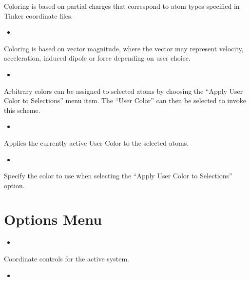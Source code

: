\documentclass[letterpaper,11pt,english]{sphinxmanual}
\begin{document}
\sphinxAtStartPar
Coloring is based on partial charges that correspond to atom types specified in Tinker coordinate files.
\begin{itemize}
\item {} 
\sphinxAtStartPar
{}

\end{itemize}

\sphinxAtStartPar
Coloring is based on vector magnitude, where the vector may represent velocity, acceleration, induced dipole or force depending on user choice.
\begin{itemize}
\item {} 
\sphinxAtStartPar
{}

\end{itemize}

\sphinxAtStartPar
Arbitrary colors can be assigned to selected atoms by choosing the “Apply User Color to Selections” menu item. The “User Color” can then be selected to invoke this scheme.
\begin{itemize}
\item {} 
\sphinxAtStartPar
{}

\end{itemize}

\sphinxAtStartPar
Applies the currently active User Color to the selected atoms.
\begin{itemize}
\item {} 
\sphinxAtStartPar
{}

\end{itemize}

\sphinxAtStartPar
Specify the color to use when selecting the “Apply User Color to Selections” option.


\section{Options Menu}
\label{\detokenize{text/menus:options-menu}}\begin{itemize}
\item {} 
\sphinxAtStartPar
{}

\end{itemize}

\sphinxAtStartPar
Coordinate controls for the active system.
\begin{itemize}
\item {} 
\sphinxAtStartPar
{}

\end{itemize}
\end{document}
